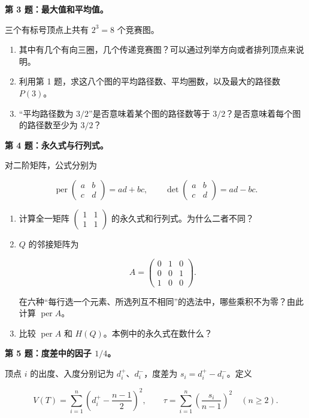 \documentclass[11pt,a4paper]{article}
\providecommand{\tightlist}{\setlength{\itemsep}{0pt}\setlength{\parskip}{0pt}}
\begin{document}
\textbf{第 3 题：最大值和平均值。}

三个有标号顶点上共有 \(2^3=8\) 个竞赛图。

\begin{enumerate}
\def\labelenumi{\arabic{enumi}.}
\tightlist
\item
  其中有几个有向三圈，几个传递竞赛图？可以通过列举方向或者排列顶点来说明。
\item
  利用第 1 题，求这八个图的平均路径数、平均圈数，以及最大的路径数 \(P(3)\)。
\item
  ``平均路径数为 \(3/2\)''是否意味着某个图的路径数等于 \(3/2\)？是否意味着每个图的路径数至少为 \(3/2\)？
\end{enumerate}

\textbf{第 4 题：永久式与行列式。}

对二阶矩阵，公式分别为

\[\operatorname{per}\begin{pmatrix}a&b\\c&d\end{pmatrix}=ad+bc,
\qquad
\det\begin{pmatrix}a&b\\c&d\end{pmatrix}=ad-bc.\]

\begin{enumerate}
\def\labelenumi{\arabic{enumi}.}
\item
  计算全一矩阵 \(\left(\begin{smallmatrix}1&1\\1&1\end{smallmatrix}\right)\) 的永久式和行列式。为什么二者不同？
\item
  \(Q\) 的邻接矩阵为

  \[A=\begin{pmatrix}0&1&0\\0&0&1\\1&0&0\end{pmatrix}.\]

  在六种``每行选一个元素、所选列互不相同''的选法中，哪些乘积不为零？由此计算 \(\operatorname{per}A\)。
\item
  比较 \(\operatorname{per}A\) 和 \(H(Q)\)。本例中的永久式在数什么？
\end{enumerate}

\textbf{第 5 题：度差中的因子 \(1/4\)。}

顶点 \(i\) 的出度、入度分别记为 \(d_i^+\)、\(d_i^-\)，度差为 \(s_i=d_i^+-d_i^-\)。定义

\[V(T)=\sum_{i=1}^n\left(d_i^+-\frac{n-1}{2}\right)^2,
\qquad
\tau=\sum_{i=1}^n\left(\frac{s_i}{n-1}\right)^2
\quad(n\ge2).\]
\end{document}
